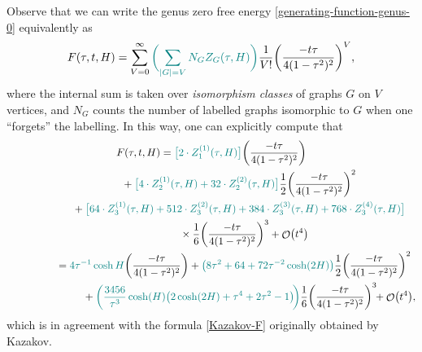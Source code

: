 \documentclass[pdftex]{sigma}
\DeclareMathOperator{\OO}{\mathcal{O}}
\numberwithin{equation}{section}
\begin{document}
Observe that we can write the genus zero free energy \eqref{generating-function-genus-0} equivalently as
 \begin{equation*}
 F(\tau,t,H) = \sum_{V=0}^{\infty} \textcolor{teal}{\biggl(\sum_{|G| = V} N_G Z_G(\tau,H) \biggr)}\frac{1}{V!}\biggl(\frac{-t\tau}{4(1-\tau^2)^2}\biggr)^V,
 \end{equation*}
where the internal sum is taken over \textit{isomorphism classes} of graphs $G$ on $V$ vertices, and $N_G$ counts the number of labelled graphs isomorphic to $G$ when one ``forgets''
the labelling. In this way, one can explicitly compute that
 \begin{gather*}
 F(\tau,t,H) = \textcolor{teal}{\bigl[2\cdot Z_1^{(1)}(\tau,H)\bigr]}\biggl(\frac{-t\tau}{4(1-\tau^2)^2}\biggr) \\
 \hphantom{F(\tau,t,H) =}{}
 + \textcolor{teal}{\bigl[4 \cdot Z_2^{(1)}(\tau,H) + 32\cdot Z_2^{(2)}(\tau,H)\bigr]}\frac{1}{2}\biggl(\frac{-t\tau}{4(1-\tau^2)^2}\biggr)^2\\
 \hphantom{F(\tau,t,H) =}{}
 + \textcolor{teal}{\bigl[64\cdot Z_3^{(1)}(\tau,H) + 512\cdot Z_3^{(2)}(\tau,H) + 384\cdot Z_3^{(3)}(\tau,H) + 768\cdot Z_3^{(4)}(\tau,H)\bigr]}\\
 \hphantom{F(\tau,t,H) =}{}\quad
 \times\frac{1}{6}\biggl(\frac{-t\tau}{4(1-\tau^2)^2}\biggr)^3+ \OO\bigl(t^4\bigr)\\
 \hphantom{F(\tau,t,H)}{}=
 \textcolor{teal}{4\tau^{-1}\cosh{H}}\biggl(\frac{-t\tau}{4(1-\tau^2)^2}\biggr) + \textcolor{teal}{\bigl(8\tau^2 + 64+72\tau^{-2}\cosh(2H)\bigr)}\frac{1}{2}\biggl(\frac{-t\tau}{4(1-\tau^2)^2}\biggr)^2\\
 \hphantom{F(\tau,t,H) =}{}
 \qquad{}+ \textcolor{teal}{\biggl(\frac{3456}{\tau^3}\cosh(H)\bigl(2\cosh(2H)+\tau^4+2\tau^2-1\bigr)\!\biggr)}\frac{1}{6}\biggl(\frac{-t\tau}{4(1-\tau^2)^2}\biggr)^3\!\! + \OO\bigl(t^4\bigr),
 \end{gather*}
which is in agreement with the formula \eqref{Kazakov-F} originally obtained by Kazakov.
\end{document}
